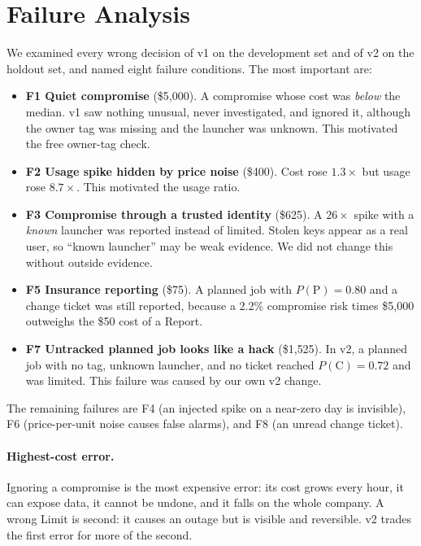 \documentclass{article}
\newcommand{\Pc}{P(\mathrm{C})}
\begin{document}
\section{Failure Analysis}

We examined every wrong decision of v1 on the development set and of v2 on the holdout set, and named eight failure conditions. The most important are:

\begin{itemize}
\item \textbf{F1 Quiet compromise} (\$5{,}000). A compromise whose cost was \emph{below} the median. v1 saw nothing unusual, never investigated, and ignored it, although the owner tag was missing and the launcher was unknown. This motivated the free owner-tag check.
\item \textbf{F2 Usage spike hidden by price noise} (\$400). Cost rose $1.3\times$ but usage rose $8.7\times$. This motivated the usage ratio.
\item \textbf{F3 Compromise through a trusted identity} (\$625). A $26\times$ spike with a \emph{known} launcher was reported instead of limited. Stolen keys appear as a real user, so ``known launcher'' may be weak evidence. We did not change this without outside evidence.
\item \textbf{F5 Insurance reporting} (\$75). A planned job with $P(\mathrm{P}) = 0.80$ and a change ticket was still reported, because a 2.2\% compromise risk times \$5{,}000 outweighs the \$50 cost of a Report.
\item \textbf{F7 Untracked planned job looks like a hack} (\$1{,}525). In v2, a planned job with no tag, unknown launcher, and no ticket reached $\Pc = 0.72$ and was limited. This failure was caused by our own v2 change.
\end{itemize}

The remaining failures are F4 (an injected spike on a near-zero day is invisible), F6 (price-per-unit noise causes false alarms), and F8 (an unread change ticket).

\paragraph{Highest-cost error.} Ignoring a compromise is the most expensive error: its cost grows every hour, it can expose data, it cannot be undone, and it falls on the whole company. A wrong Limit is second: it causes an outage but is visible and reversible. v2 trades the first error for more of the second.
\end{document}

